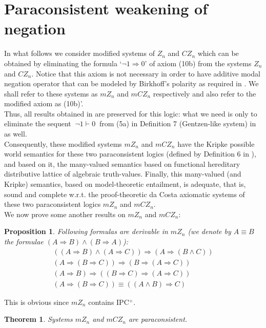 \documentclass{llncs}
\newtheorem{theo}{Theorem}
\newtheorem{propo}{Proposition}
\begin{document}
\section{Paraconsistent weakening of negation}
In what follows we
consider modified systems of $Z_n$ and $CZ_n$ which can be obtained
by eliminating the formula `$\neg 1 \Rightarrow 0$' of axiom (10b)
from the systems $Z_n$ and $CZ_n$. Notice that this axiom is not
necessary in order to have additive modal negation operator that can
be modeled by Birkhoff's polarity as required in \cite{Majk08dc}. We
shall refer to these systems as $mZ_n$ and $mCZ_n$ respectively and
also refer to the modified
axiom as (10b)'.\\
Thus, all results obtained in \cite{Majk08dc} are preserved for this
logic: what we need is only to eliminate the sequent $~ \neg 1
\vdash 0~$ from (5a) in Definition 7 (Gentzen-like system) in
\cite{Majk08dc} as well.\\
Consequently, these modified systems $mZ_n$ and $mCZ_n$ have the
Kripke possible world semantics
 for these two paraconsistent logics (defined by Definition 6 in \cite{Majk08dc}), and based on it, the
 many-valued semantics based on functional hereditary distributive
 lattice of algebraic truth-values. Finally,  this many-valued (and Kripke) semantics, based on model-theoretic entailment, is
 adequate, that is, sound and complete w.r.t. the proof-theoretic da
 Costa axiomatic systems of these two paraconsistent logics $mZ_n$ and
 $mCZ_n$.\\
 We now prove some another results on $mZ_n$ and $mCZ_n$:
\begin{propo}
Following formulas are derivable in $mZ_n$ (we denote by $A \equiv
B$ the formulae $(A \Rightarrow B) \wedge (B\Rightarrow A)$):
\begin{gather}
((A\Rightarrow B) \wedge (A \Rightarrow C))\Rightarrow (A
\Rightarrow (B\wedge C)) \tag{T0} \label{Composition}\\
(A\Rightarrow (B\Rightarrow C))\Rightarrow (B\Rightarrow (A\Rightarrow C)) \tag{T1} \label{Exchange} \\
(A\Rightarrow B)\Rightarrow ((B\Rightarrow C)\Rightarrow (A\Rightarrow C)) \tag{T2} \label{Syllogism} \\
(A\Rightarrow (B\Rightarrow C))\equiv ((A\land B)\Rightarrow C)
\tag{T3} \label{impland}
\end{gather}
\end{propo}
This is obvious since $mZ_n$ contains IPC$^+$.
\begin{theo}
Systems $mZ_n$ and $mCZ_n$ are paraconsistent.
\end{theo}
\end{document}
